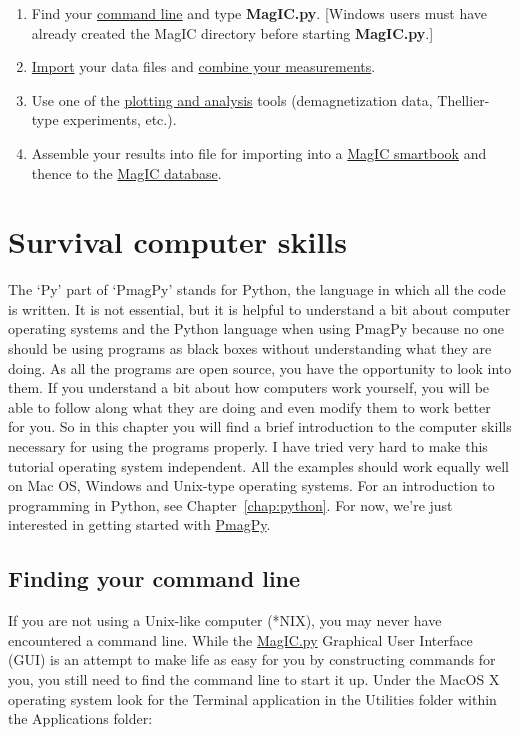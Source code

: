 \documentclass[11pt]{book}
\begin{document}
{\begin{enumerate}
  \item Find your \href{#command_line}{command line} and type {\bf MagIC.py}. [Windows users must have already created the MagIC directory before starting {\bf MagIC.py}.]
 \item \href{#ImportMenu}{Import} your data files and \href{#Combining_measurement_files}{combine your measurements}.
 \item Use one of the \href{#AnalysisPlotsMenu}{plotting and analysis} tools (demagnetization data, Thellier-type experiments, etc.).
 \item Assemble your results into file for importing into a \href{#Uploading}{MagIC smartbook} and thence to the \href{http://earthref.org/MAGIC}{MagIC database}.   
 \end{enumerate}

{}
\chapter{Survival computer skills}
\label{ex:unix}

The `Py' part of  `PmagPy' stands for Python, the language in which all the code is written.   It is not essential, but it is helpful to understand a bit about computer operating systems and the Python language when using PmagPy because no one should be using programs as black boxes without understanding what they are doing. As all the programs are open source, you have the opportunity to look into them.  If you understand a bit  about how computers work yourself, you will be able to follow along what they are doing and even modify them to work better for you.   So in this chapter you will find a brief introduction to the computer skills necessary for using the programs properly.   I have tried very hard to make this tutorial operating system independent.  All the examples should work equally well on Mac OS, Windows and Unix-type operating systems.  For an introduction to programming in Python, see Chapter~\ref{chap:python}. For now, we're just interested in getting started with \href{#PmagPy}{PmagPy}.   


\section{Finding your command line}
If you are not using a Unix-like computer (*NIX), you may never have encountered a command line. While the \href{#MagIC.py}{MagIC.py} Graphical User Interface (GUI) is an attempt to make life as easy for you by constructing commands for you, you still need to find the command line to start it up.  Under the MacOS X operating system look for the Terminal application in the Utilities folder within the Applications folder:

}
\end{document}
